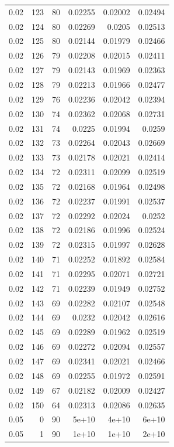 \begin{tabular}{rrrrrr}
0.02 & 123 & 80 & 0.02255 & 0.02002 & 0.02494 \\
0.02 & 124 & 80 & 0.02269 & 0.0205 & 0.02513 \\
0.02 & 125 & 80 & 0.02144 & 0.01979 & 0.02466 \\
0.02 & 126 & 79 & 0.02208 & 0.02015 & 0.02411 \\
0.02 & 127 & 79 & 0.02143 & 0.01969 & 0.02363 \\
0.02 & 128 & 79 & 0.02213 & 0.01966 & 0.02477 \\
0.02 & 129 & 76 & 0.02236 & 0.02042 & 0.02394 \\
0.02 & 130 & 74 & 0.02362 & 0.02068 & 0.02731 \\
0.02 & 131 & 74 & 0.0225 & 0.01994 & 0.0259 \\
0.02 & 132 & 73 & 0.02264 & 0.02043 & 0.02669 \\
0.02 & 133 & 73 & 0.02178 & 0.02021 & 0.02414 \\
0.02 & 134 & 72 & 0.02311 & 0.02099 & 0.02519 \\
0.02 & 135 & 72 & 0.02168 & 0.01964 & 0.02498 \\
0.02 & 136 & 72 & 0.02237 & 0.01991 & 0.02537 \\
0.02 & 137 & 72 & 0.02292 & 0.02024 & 0.0252 \\
0.02 & 138 & 72 & 0.02186 & 0.01996 & 0.02524 \\
0.02 & 139 & 72 & 0.02315 & 0.01997 & 0.02628 \\
0.02 & 140 & 71 & 0.02252 & 0.01892 & 0.02584 \\
0.02 & 141 & 71 & 0.02295 & 0.02071 & 0.02721 \\
0.02 & 142 & 71 & 0.02239 & 0.01949 & 0.02752 \\
0.02 & 143 & 69 & 0.02282 & 0.02107 & 0.02548 \\
0.02 & 144 & 69 & 0.0232 & 0.02042 & 0.02616 \\
0.02 & 145 & 69 & 0.02289 & 0.01962 & 0.02519 \\
0.02 & 146 & 69 & 0.02272 & 0.02094 & 0.02557 \\
0.02 & 147 & 69 & 0.02341 & 0.02021 & 0.02466 \\
0.02 & 148 & 69 & 0.02255 & 0.01972 & 0.02591 \\
0.02 & 149 & 67 & 0.02182 & 0.02009 & 0.02427 \\
0.02 & 150 & 64 & 0.02313 & 0.02086 & 0.02635 \\
0.05 & 0 & 90 & 5e+10 & 4e+10 & 6e+10 \\
0.05 & 1 & 90 & 1e+10 & 1e+10 & 2e+10 \\

\end{tabular}
